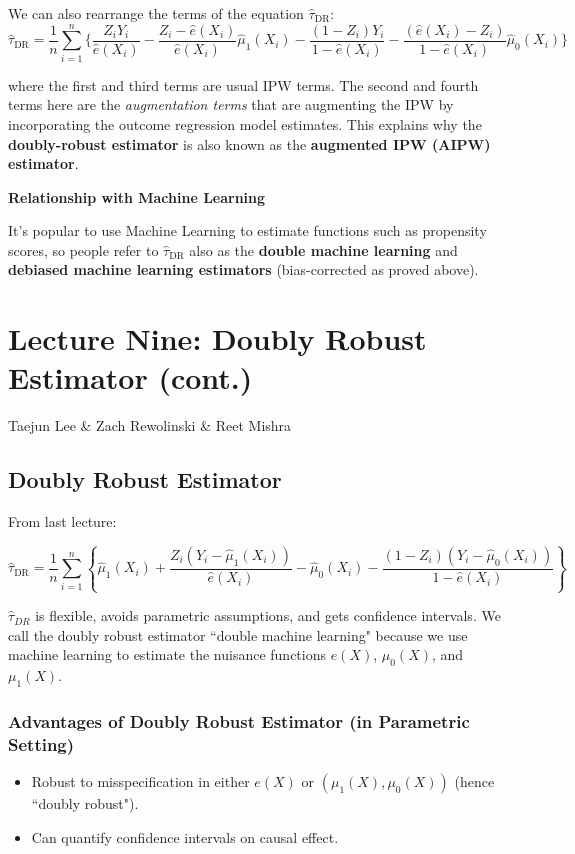 We can also rearrange the terms of the equation $\hat{\tau}_{\text{DR}}$:
\begin{equation}
\hat{\tau}_{\text{DR}} = \frac{1}{n} \sum_{i=1}^{n} \{ 
\frac{Z_i Y_i}{\hat{e}\left(X_i\right)} - \frac{Z_i - \hat{e}\left(X_i\right)}{\hat{e}\left(X_i\right)}\hat{\mu}_1\left(X_i\right) - \frac{\left(1 - Z_i\right) Y_i}{1 - \hat{e}\left(X_i\right)} - \frac{\left(\hat{e}\left(X_i\right) - Z_i\right)}{1 - \hat{e}\left(X_i\right)}\hat{\mu}_0\left(X_i\right)
\}
\end{equation}

where the first and third terms are usual IPW terms. The second and fourth terms here are the \emph{augmentation terms} that are augmenting the IPW by incorporating the outcome regression model estimates. This explains why the \textbf{doubly-robust estimator} is also known as the \textbf{augmented IPW (AIPW) estimator}. 


\textbf{Relationship with Machine Learning}

It's popular to use Machine Learning to estimate functions such as propensity scores, so people refer to $\hat{\tau}_{\text{DR}}$ also as the \textbf{double machine learning} and \textbf{debiased machine learning estimators} (bias-corrected as proved above).





\section{Lecture Nine: Doubly Robust Estimator (cont.)}
{Taejun Lee \& Zach Rewolinski \& Reet Mishra}

\subsection{Doubly Robust Estimator}
From last lecture:

\[\hat{\tau}_{\text{DR}} = \frac{1}{n} \sum\limits_{i=1}^{n} \left\{\hat{\mu}_1(X_i) + \frac{Z_i(Y_i - \hat{\mu}_1(X_i))}{\hat{e}(X_i)} - \hat{\mu}_0(X_i) - \frac{(1 - Z_i)(Y_i - \hat{\mu}_0(X_i))}{1 - \hat{e}(X_i)}\right\}\]

$\hat{\tau}_{DR}$ is flexible, avoids parametric assumptions, and gets confidence intervals. We call the doubly robust estimator ``double machine learning" because we use machine learning to estimate the nuisance functions $e(X)$, $\mu_0(X)$, and $\mu_1(X)$.

\subsubsection{Advantages of Doubly Robust Estimator (in Parametric Setting)}
\begin{itemize}
    \item Robust to misspecification in either $e(X)$ or $(\mu_1(X),\mu_0(X))$ (hence ``doubly robust").
    \item Can quantify confidence intervals on causal effect.
\end{itemize}

